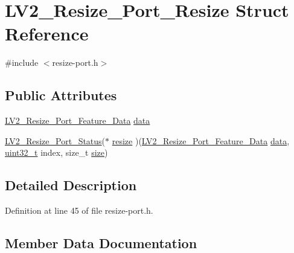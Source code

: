\hypertarget{struct_l_v2___resize___port___resize}{}\section{L\+V2\+\_\+\+Resize\+\_\+\+Port\+\_\+\+Resize Struct Reference}
\label{struct_l_v2___resize___port___resize}


{\ttfamily \#include $<$resize-\/port.\+h$>$}

\subsection*{Public Attributes}
\begin{DoxyCompactItemize}
\item 
\hyperlink{resize-port_8h_abcf71f3dca55343488d9bd36e71d2392}{L\+V2\+\_\+\+Resize\+\_\+\+Port\+\_\+\+Feature\+\_\+\+Data} \hyperlink{struct_l_v2___resize___port___resize_a3d64b6e7133cdae620b81286fb5ed2fa}{data}
\item 
\hyperlink{resize-port_8h_a71a46a5f08e889faa1b5b737bd2bcc16}{L\+V2\+\_\+\+Resize\+\_\+\+Port\+\_\+\+Status}($\ast$ \hyperlink{struct_l_v2___resize___port___resize_aebcf76aa587acc573c14ae09370c444a}{resize} )(\hyperlink{resize-port_8h_abcf71f3dca55343488d9bd36e71d2392}{L\+V2\+\_\+\+Resize\+\_\+\+Port\+\_\+\+Feature\+\_\+\+Data} \hyperlink{lib_2expat_8h_ac39e72a1de1cb50dbdc54b08d0432a24}{data}, \hyperlink{lib-src_2ffmpeg_2win32_2stdint_8h_a6eb1e68cc391dd753bc8ce896dbb8315}{uint32\+\_\+t} index, size\+\_\+t \hyperlink{group__lavu__mem_ga854352f53b148adc24983a58a1866d66}{size})
\end{DoxyCompactItemize}


\subsection{Detailed Description}


Definition at line 45 of file resize-\/port.\+h.



\subsection{Member Data Documentation}
